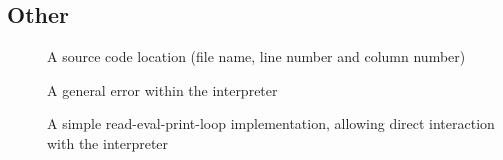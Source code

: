 \subsection{Other}

\begin{description}
  \item[] A source code location (file name, line number and column number)
  
  \item[] A general error within the interpreter
  
  \item[] A simple read-eval-print-loop implementation, allowing direct interaction with the interpreter
\end{description}
